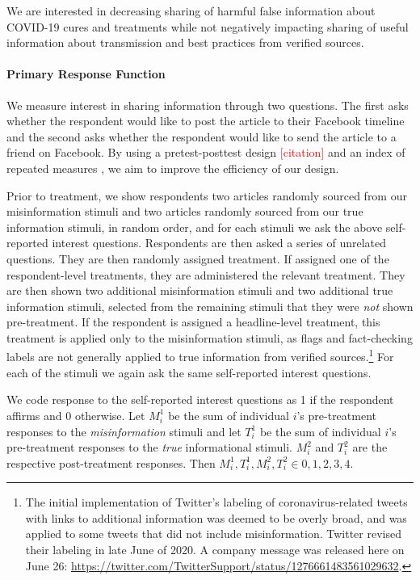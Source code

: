 \documentclass[letterpaper, 12pt, parskip=full,]{scrartcl}
\begin{document}
We are interested in decreasing sharing of harmful false information about COVID-19 cures and treatments while not negatively impacting sharing of useful information about transmission and best practices from verified sources. 

\paragraph{Primary Response Function}

We measure interest in sharing information through two questions. The first asks whether the respondent would like to post the article to their Facebook timeline and the second asks whether the respondent would like to send the article to a friend on Facebook. By using a pretest-posttest design \textcolor{red}{[citation]} and an index of repeated measures \citep{broockman2017design}, we aim to improve the efficiency of our design. 

Prior to treatment, we show respondents two articles randomly sourced from our misinformation stimuli and two articles randomly sourced from our true information stimuli, in random order, and for each stimuli we ask the above self-reported interest questions. Respondents are then asked a series of unrelated questions. They are then randomly assigned treatment. If assigned one of the respondent-level treatments, they are administered the relevant treatment. They are then shown two additional misinformation stimuli and two additional true information stimuli, selected from the remaining stimuli that they were \textit{not} shown pre-treatment. If the respondent is assigned a headline-level treatment, this treatment is applied only to the misinformation stimuli, as flags and fact-checking labels are not generally applied to true information from verified sources.\footnote{The initial implementation of Twitter's labeling of coronavirus-related tweets with links to additional information was deemed to be overly broad, and was applied to some tweets that did not include misinformation. Twitter revised their labeling in late June of 2020. A company message was released here on June 26: \url{https://twitter.com/TwitterSupport/status/1276661483561029632}. } For each of the stimuli we again ask the same self-reported interest questions.


We code response to the self-reported interest questions as 1 if the respondent affirms and 0 otherwise. Let $M_i^1$ be the sum of individual $i$'s pre-treatment responses to the \textit{misinformation} stimuli and let $T_i^1$ be the sum of individual $i$'s pre-treatment responses to the \textit{true} informational stimuli. $M_i^2$ and $T_i^2$ are the respective post-treatment responses. Then $M_i^1, T_i^1, M_i^2, T_i^2 \in {0,1,2,3,4}$. 
\end{document}
